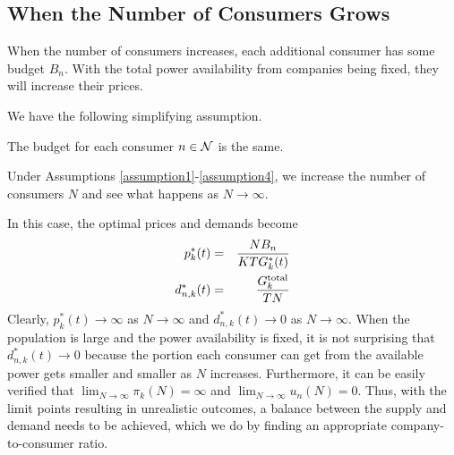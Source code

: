 \subsection{When the Number of Consumers Grows} When the number of consumers increases, each additional consumer has some budget $B_n$. With the total power availability from companies being fixed, they will increase their prices. {\color{black}  We have the following simplifying assumption. 

\begin{assumption} 
The budget for each consumer $n \in {\cal N}$ is the same.
\label{assumption4}
\end{assumption}



Under Assumptions \ref{assumption1}-\ref{assumption4}, we increase the number of consumers $N$ and see what happens as $N \rightarrow \infty$.} In this case, the optimal prices and demands become
\begin{eqnarray}p^*_k(t)&=&\frac{NB_n}{KTG^*_k(t)} \label{pppp}\\
d^*_{n,k}(t) &=& \frac{G^{{\rm total}}_k}{TN} \label{dd} \end{eqnarray}
Clearly, $p^*_k(t)\rightarrow\infty$ as $N\rightarrow\infty$ and $d^*_{n,k}(t)\rightarrow0$ as $N\rightarrow\infty$. When the population is large and the power availability is fixed, it is not surprising that $d^*_{n,k}(t)\rightarrow0$ because the portion each consumer can get from the available power gets smaller and smaller as $N$ increases. Furthermore, it can be easily verified that $\lim_{N\rightarrow \infty}\pi_k(N)=\infty$ and $\lim_{N\rightarrow \infty}u_n(N)=0$. Thus, with the limit points resulting in unrealistic outcomes, a balance between the supply and demand needs to be achieved, which we do by finding an appropriate company-to-consumer ratio. 


